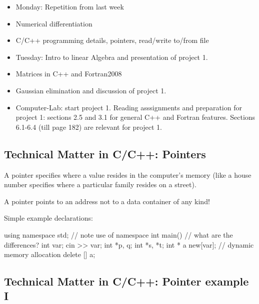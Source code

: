 \documentclass[%
twoside,                 %
final,                   %
10pt]{article}
\newenvironment{block_mdfboxadmon}[1][]{
\begin{block_mdfboxmdframed}[frametitle=#1]
}
{
\end{block_mdfboxmdframed}
}
\begin{document}
\begin{block_mdfboxadmon}[]
\begin{itemize}
  \item Monday: Repetition from last week

  \item Numerical differentiation

  \item C/C++ programming details, pointers, read/write to/from file

  \item Tuesday: Intro to linear Algebra and presentation of project 1.

  \item Matrices in C++ and Fortran2008

  \item Gaussian elimination and discussion of project 1.

  \item Computer-Lab: start project 1. Reading asssignments and preparation for project 1: sections 2.5 and 3.1 for general C++ and Fortran features. Sections 6.1-6.4 (till page 182) are relevant for project 1.
\end{itemize}

\noindent
\end{block_mdfboxadmon}



\subsection{Technical Matter in C/C++: Pointers}


\begin{block_mdfboxadmon}[]
A pointer specifies where a value resides in the computer's memory (like a house number specifies where a particular family resides on a street).

A pointer points to an address not to a data container of any kind!

Simple example declarations:

\bcppcod
  using namespace std; // note use of namespace
  int main()
 {
   // what are the differences?
   int var;
   cin >> var;
   int *p, q;
   int *s, *t;
   int * a new[var];    // dynamic memory allocation
   delete [] a;
}
\ecppcod
\end{block_mdfboxadmon}



\subsection{Technical Matter in C/C++: Pointer example I}
\end{document}
